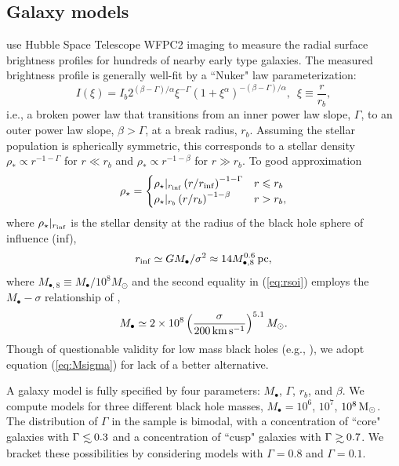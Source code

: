 \documentclass[usenatbib,fleqn]{mn2e}
\newcommand\lsim{\mathrel{\rlap{\lower4pt\hbox{\hskip1pt$\sim$}}
    \raise1pt\hbox{$<$}}}
\newcommand\gsim{\mathrel{\rlap{\lower4pt\hbox{\hskip1pt$\sim$}}
    \raise1pt\hbox{$>$}}}
\newcommand{\rb}{r_b}
\newcommand{\rhostar}{\rho_*}
\newcommand{\Mbh}[1][]{M_{\bullet#1}}
\newcommand{\soi}{\rm inf}
\newcommand{\rsoi}{r_{\soi}}
\begin{document}
\subsection{Galaxy models}
\label{sec:gal_model}
\citet{LauerFaber+:2007a} use Hubble Space Telescope WFPC2 imaging to
measure the radial surface brightness profiles for hundreds of nearby
early type galaxies. The measured brightness profile is generally
well-fit by a ``Nuker" law parameterization:
\begin{equation}
  I(\xi)=I_b 2^{(\beta-\Gamma)/\alpha} \xi^{-\Gamma} (1+\xi^\alpha)^{-(\beta-\Gamma)/\alpha}, \,\,\,\xi\equiv\frac{r}{r_b},
\end{equation}
i.e., a broken power law that transitions from an inner power law
slope, $\Gamma$, to an outer power law slope, $\beta > \Gamma$, at a
break radius, $\rb$.  Assuming the stellar population is spherically
symmetric, this corresponds to a stellar density $\rhostar \propto
r^{-1-\Gamma}$ for $r \ll \rb$ and $\rhostar\propto r^{-1-\beta}$ for
$r \gg \rb$.  To good approximation
\begin{align}
\rho_\star = 
\begin{cases}
\rho_\star|_{\rsoi} \left(r/\rsoi\right)^{-1-\Gamma} & r \leq r_b\\
\rho_\star|_{r_b} \left(r/r_b\right)^{-1-\beta} & r > r_b,
\label{eq:rhostar}
\end{cases}
\end{align}
where $\rho_\star|_{\rsoi}$ is the stellar density at the radius of the black hole sphere of influence (inf), 
\begin{equation}
\rsoi \simeq G \Mbh/\sigma^2 \approx 14 M_{\bullet,8}^{0.6}\,{\rm pc},
\label{eq:rsoi}
\end{equation}
where $M_{\bullet,8} \equiv M_{\bullet}/10^{8}M_{\odot}$ and the
second equality in (\ref{eq:rsoi}) employs the $\Mbh-\sigma$
relationship of \citet{McConnellMa+:2011a},
 \begin{align}
M_{\bullet} \simeq 2\times 10^{8}\left(\frac{\sigma}{200\,{\rm
      km\,s^{-1}}}\right)^{5.1}M_{\odot}.
\label{eq:Msigma}
\end{align}
Though of questionable validity for low mass black holes (e.g., \citealt{Greene&Ho07}), we adopt equation (\ref{eq:Msigma}) for lack of a better alternative.

A galaxy model is fully specified by four parameters: $\Mbh$,
$\Gamma$, $r_b$, and $\beta$.  We compute models for three different
black hole masses, $\Mbh = 10^6$, $10^7$, $10^8 \,{\rm M_\odot}$.  The
distribution of $\Gamma$ in the \citet{LauerFaber+:2007a} sample is
bimodal, with a concentration of ``core" galaxies with $\Gamma \lsim
0.3$ and a concentration of ``cusp" galaxies with $\Gamma \gsim 0.7$.
We bracket these possibilities by considering models with $\Gamma=0.8$
and $\Gamma=0.1$.  
\end{document}
